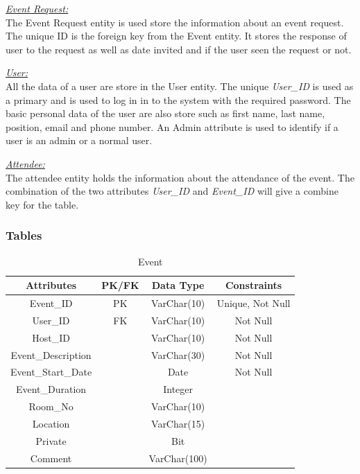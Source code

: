 \documentclass[a4paper]{article}
\begin{document}
\underline{\textit{Event Request:}} \\
The Event Request entity is used store the information about an event request. The unique ID is the foreign key from the Event entity. It stores the response of user to the request as well as date invited and if the user seen the request or not. 

\underline{\textit{User:}} \\
All the data of a user are store in the User entity. The unique \textit{User\_ID} is used as a primary and is used to log in in to the system with the required password. The basic personal data of the user are also store such as first name, last name, position, email and phone number. An Admin attribute is used to identify if a user is an admin or a normal user. 

\underline{\textit{Attendee:}} \\
The attendee entity holds the information about the attendance of the event. The combination of the two attributes \textit{User\_ID} and \textit{Event\_ID} will give a combine key for the table. 
\break
\subsubsection{Tables}
\begin{table}[ht]
    \caption{Event}
    \centering
    \begin{tabular}{|c|c|c|c|}
        \hline
        Attributes & PK/FK & Data Type & Constraints  \\
        \hline
        Event\_ID & PK & VarChar(10) & Unique, Not Null \\
        \hline
        User\_ID & FK & VarChar(10) & Not Null \\
        \hline
        Host\_ID & & VarChar(10) & Not Null \\
        \hline
        Event\_Description & & VarChar(30) & Not Null \\
        \hline
        Event\_Start\_Date & & Date & Not Null \\
        \hline
        Event\_Duration & & Integer & \\
        \hline
        Room\_No & & VarChar(10) & \\
        \hline
        Location & & VarChar(15) & \\
        \hline
        Private & & Bit & \\
        \hline
        Comment & & VarChar(100) & \\
        \hline
    \end{tabular}
    \label{tab:event}
\end{table}
\end{document}
